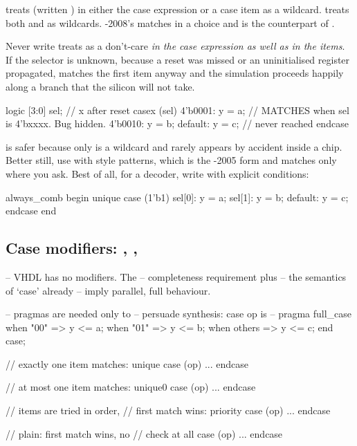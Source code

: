  treats  (written ) in either the case expression or
a case item as a wildcard.  treats both  and  as
wildcards. \VHDL{}-2008's  matches  in a choice and is
the counterpart of .

\begin{gotcha}{Never write }
 treats  as a don't-care \emph{in the case expression as
well as in the items}. If the selector is unknown, because a reset was missed
or an uninitialised register propagated,  matches the first item
anyway and the simulation proceeds happily along a branch that the silicon will
not take.
\begin{svcode}
logic [3:0] sel;      // x after reset
casex (sel)
  4'b0001: y = a;     // MATCHES when sel is 4'bxxxx. Bug hidden.
  4'b0010: y = b;
  default: y = c;     // never reached
endcase
\end{svcode}
 is safer because only  is a wildcard and  rarely
appears by accident inside a chip. Better still, use 
with  style patterns, which is the \SV{}-2005 form and matches
only where you ask. Best of all, for a decoder, write  with
explicit conditions:
\begin{svcode}
always_comb begin
  unique case (1'b1)
    sel[0]: y = a;
    sel[1]: y = b;
    default: y = c;
  endcase
end
\end{svcode}
\end{gotcha}

\subsection{Case modifiers: , , }

\begin{rosetta}
\begin{rleft}
-- VHDL has no modifiers. The
-- completeness requirement plus
-- the semantics of `case' already
-- imply parallel, full behaviour.

-- pragmas are needed only to
-- persuade synthesis:
case op is           -- pragma full_case
  when "00" => y <= a;
  when "01" => y <= b;
  when others => y <= c;
end case;
\end{rleft}
\begin{rright}
// exactly one item matches:
unique case (op) ... endcase

// at most one item matches:
unique0 case (op) ... endcase

// items are tried in order,
// first match wins:
priority case (op) ... endcase

// plain: first match wins, no
// check at all
case (op) ... endcase
\end{rright}
\end{rosetta}

